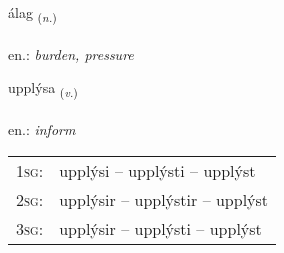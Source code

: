 \documentclass[frontgrid, backgrid]{flacards}\usepackage[]{graphicx}\usepackage[]{xcolor}
\begin{document}
{álag \small{\textsubscript{(\textit{n.})}} \\[1ex] %
\textphonetic{[auːlaɣ]} \\
en.: \emph{burden, pressure} \\  [2ex]
\renewcommand*{\arraystretch}{0.8}
}

\renewcommand{\flhead}{\vskip5pt \fboxsep=0pt {\small\bfseries\footnotesize Sagnorð | Verb}}
\renewcommand{\fcfoot}{\vskip5pt \fboxsep=0pt \hspace{2pt}{\small\bfseries\footnotesize 2K}}

\renewcommand{\blhead}{\vskip5pt {\small\bfseries\footnotesize Sagnorð | Verb }}
\renewcommand{\bcfoot}{\vskip5pt \hspace{2pt}{\small\bfseries\footnotesize 2K}}


{upplýsa \small{\textsubscript{(\textit{v.})}} \\[1ex] %
\textphonetic{[ʏhplisa]} \\
en.: \emph{inform} \\  [2ex]
\renewcommand*{\arraystretch}{0.8}
\begin{tabular}{p{1cm}l}
\textsc{1sg}: & upplýsi -- upplýsti -- upplýst \\ 
\textsc{2sg}: & upplýsir -- upplýstir -- upplýst \\ 
\textsc{3sg}: & upplýsir -- upplýsti -- upplýst \\ 
\end{tabular}
}

\renewcommand{\flhead}{\vskip5pt \fboxsep=0pt {\small\bfseries\footnotesize Nafnorð | Noun}}
\renewcommand{\fcfoot}{\vskip5pt \fboxsep=0pt \hspace{2pt}{\small\bfseries\footnotesize 2K}}
\end{document}
